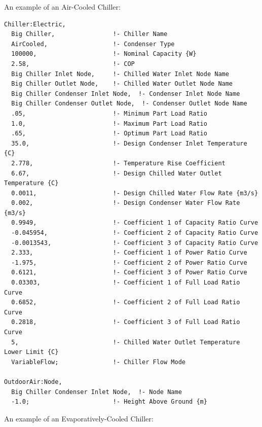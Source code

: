 An example of an Air-Cooled Chiller:

\begin{lstlisting}
Chiller:Electric,
  Big Chiller,                !- Chiller Name
  AirCooled,                  !- Condenser Type
  100000,                     !- Nominal Capacity {W}
  2.58,                       !- COP
  Big Chiller Inlet Node,     !- Chilled Water Inlet Node Name
  Big Chiller Outlet Node,    !- Chilled Water Outlet Node Name
  Big Chiller Condenser Inlet Node,  !- Condenser Inlet Node Name
  Big Chiller Condenser Outlet Node,  !- Condenser Outlet Node Name
  .05,                        !- Minimum Part Load Ratio
  1.0,                        !- Maximum Part Load Ratio
  .65,                        !- Optimum Part Load Ratio
  35.0,                       !- Design Condenser Inlet Temperature {C}
  2.778,                      !- Temperature Rise Coefficient
  6.67,                       !- Design Chilled Water Outlet Temperature {C}
  0.0011,                     !- Design Chilled Water Flow Rate {m3/s}
  0.002,                      !- Design Condenser Water Flow Rate {m3/s}
  0.9949,                     !- Coefficient 1 of Capacity Ratio Curve
  -0.045954,                  !- Coefficient 2 of Capacity Ratio Curve
  -0.0013543,                 !- Coefficient 3 of Capacity Ratio Curve
  2.333,                      !- Coefficient 1 of Power Ratio Curve
  -1.975,                     !- Coefficient 2 of Power Ratio Curve
  0.6121,                     !- Coefficient 3 of Power Ratio Curve
  0.03303,                    !- Coefficient 1 of Full Load Ratio Curve
  0.6852,                     !- Coefficient 2 of Full Load Ratio Curve
  0.2818,                     !- Coefficient 3 of Full Load Ratio Curve
  5,                          !- Chilled Water Outlet Temperature Lower Limit {C}
  VariableFlow;               !- Chiller Flow Mode

OutdoorAir:Node,
  Big Chiller Condenser Inlet Node,  !- Node Name
  -1.0;                       !- Height Above Ground {m}
\end{lstlisting}

An example of an Evaporatively-Cooled Chiller:

